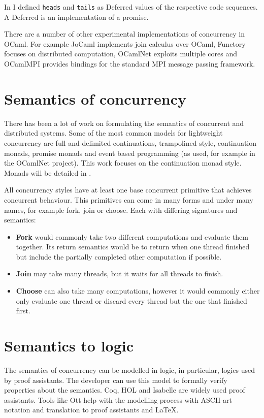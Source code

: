 \documentclass[12pt,twoside,notitlepage]{report}
\theoremstyle{plain}%
\theoremstyle{definition}
\theoremstyle{remark}
\begin{document}
In  I defined \verb|heads| and \verb|tails| as Deferred values of the respective code sequences. A Deferred is an implementation of a promise.


There are a number of other experimental implementations of concurrency in OCaml. For example JoCaml\cite{jocaml} implements join calculus over OCaml, Functory\cite{functory} focuses on distributed computation, OCamlNet exploits multiple cores and OCamlMPI\cite{ocamlmpi} provides bindings for the standard MPI message passing framework.


\section{Semantics of concurrency}

There has been a lot of work on formulating the semantics of concurrent and distributed systems. Some of the most common models for lightweight concurrency\cite{deleuzelight} are full\cite{friedman1988applications,leroyocaml} and delimited\cite{kiselyov2010delimited} continuations\cite{shan2004shift}, trampolined style\cite{ganz1999trampolined}, continuation monads\cite{Claessen99functionalpearls}, promise monads\cite{liskov1988promises} and event based programming (as used, for example in the OCamlNet\cite{Ocamlnet} project). This work focuses on the continuation monad style. Monads will be detailed in .

All concurrency styles have at least one base concurrent primitive that achieves concurrent behaviour. This primitives can come in many forms and under many names, for example fork, join or choose. Each with differing signatures and semantics:\label{sec:con_prims}
\begin{itemize}
\item{\textbf{Fork} would commonly take two different computations and evaluate them together. Its return semantics would be to return when one thread finished but include the partially completed other computation if possible.}
\item{\textbf{Join} may take many threads, but it waits for all threads to finish.}
\item{\textbf{Choose} can also take many computations, however it would commonly either only evaluate one thread or discard every thread but the one that finished first.}
\end{itemize}

\section{Semantics to logic}
The semantics of concurrency can be modelled in logic, in particular, logics used by proof assistants. The developer can use this model to formally verify properties about the semantics\cite{benton2008mechanized,blazy2009mechanized,blazy2006formal,leroy2009formal}. Coq\cite{Coq}, HOL and Isabelle are widely used proof assistants. Tools like Ott\cite{Ott} help with the modelling process with ASCII-art notation and translation to proof assistants and \LaTeX.
\end{document}
